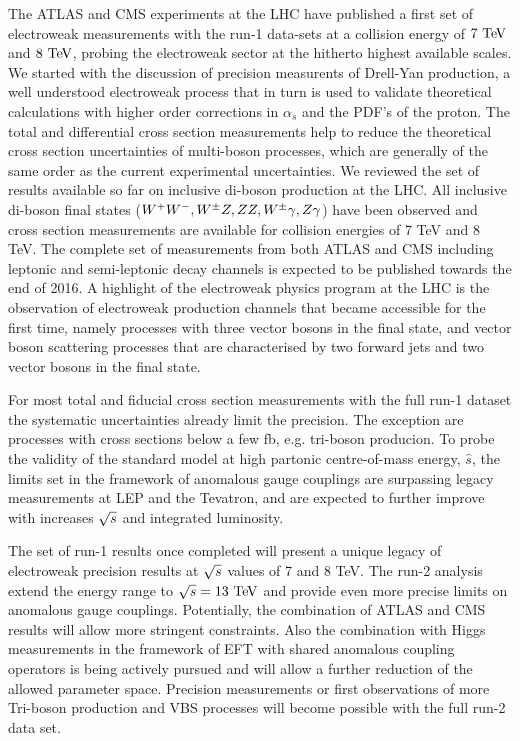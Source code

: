 The ATLAS and CMS experiments at the LHC have published a first set of electroweak measurements with the 
run-1 data-sets at a collision energy of $7\TeV$ and $8\TeV$,
probing the electroweak sector at the hitherto highest available scales.
We started with the discussion of precision measurents of Drell-Yan production, a well understood electroweak
process that in turn is used to validate theoretical calculations with higher order corrections in
$\alpha_s$ and the PDF's of the proton. The total and differential cross section measurements help to 
reduce the theoretical cross section uncertainties of multi-boson processes, which are generally of the same order as the current
experimental uncertainties.  
We reviewed the set of results available so far on inclusive di-boson production at the LHC. All inclusive di-boson final states
($W^+W^-,W^{\pm}Z,ZZ,W^{\pm}\gamma,Z\gamma$) have been observed and cross section measurements are available for collision energies of 7 TeV and 8 TeV. 
The complete set of measurements from both ATLAS and CMS including leptonic and semi-leptonic decay channels
is expected to be published towards the end of 2016.
A highlight of the electroweak physics program at the LHC is the observation of electroweak production channels 
that became accessible for the first time, namely processes with 
three vector bosons in the final state, and vector boson scattering processes that are 
characterised by two forward jets and two vector bosons in the final state.

For most total and fiducial cross section measurements with the full run-1 dataset the systematic uncertainties 
already limit the precision. The exception are processes with cross sections below a few fb, e.g. tri-boson producion. 
To probe the validity of the standard model at high partonic centre-of-mass energy, $\hat{s}$, the limits
set in the framework of anomalous gauge couplings are surpassing legacy measurements at LEP and the Tevatron,
and are expected to further improve with increases $\sqrt{s}$ and integrated luminosity. 

The set of run-1 results once completed will present a unique legacy of electroweak precision results at 
$\sqrt{s}$ values of 7 and 8 TeV.
The run-2 analysis extend the energy range to $\rts=13\TeV$ 
and provide even more precise limits on anomalous gauge couplings. Potentially, 
the combination of ATLAS and CMS results will allow more stringent constraints. Also the combination
with Higgs measurements in the framework of EFT with shared anomalous coupling operators is being 
actively pursued and will allow a further reduction of the allowed parameter space. 
Precision measurements or first observations of more Tri-boson production and VBS processes will become possible with the full 
run-2 data set. 


 
